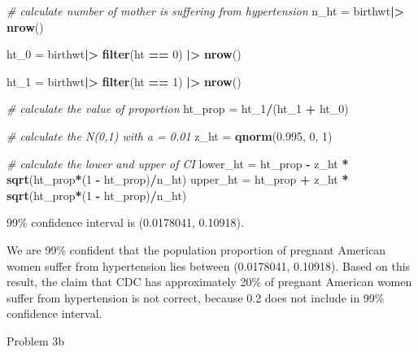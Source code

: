 \documentclass[
]{article}
\newenvironment{Shaded}{\begin{snugshade}}{\end{snugshade}}
\newcommand{\CommentTok}[1]{\textcolor[rgb]{0.56,0.35,0.01}{\textit{#1}}}
\newcommand{\DecValTok}[1]{\textcolor[rgb]{0.00,0.00,0.81}{#1}}
\newcommand{\FloatTok}[1]{\textcolor[rgb]{0.00,0.00,0.81}{#1}}
\newcommand{\FunctionTok}[1]{\textcolor[rgb]{0.13,0.29,0.53}{\textbf{#1}}}
\newcommand{\NormalTok}[1]{#1}
\newcommand{\OtherTok}[1]{\textcolor[rgb]{0.56,0.35,0.01}{#1}}
\newcommand{\SpecialCharTok}[1]{\textcolor[rgb]{0.81,0.36,0.00}{\textbf{#1}}}
\begin{document}
\begin{Shaded}
\begin{Highlighting}[]
\CommentTok{\# calculate number of mother is suffering from hypertension}
\NormalTok{n\_ht }\OtherTok{=} 
\NormalTok{  birthwt}\SpecialCharTok{|\textgreater{}}
  \FunctionTok{nrow}\NormalTok{()}

\NormalTok{ht\_0 }\OtherTok{=} 
\NormalTok{  birthwt}\SpecialCharTok{|\textgreater{}}
  \FunctionTok{filter}\NormalTok{(ht }\SpecialCharTok{==} \DecValTok{0}\NormalTok{) }\SpecialCharTok{|\textgreater{}}
  \FunctionTok{nrow}\NormalTok{()}

\NormalTok{ht\_1 }\OtherTok{=}
\NormalTok{  birthwt}\SpecialCharTok{|\textgreater{}}
  \FunctionTok{filter}\NormalTok{(ht }\SpecialCharTok{==} \DecValTok{1}\NormalTok{) }\SpecialCharTok{|\textgreater{}}
  \FunctionTok{nrow}\NormalTok{()}

\CommentTok{\# calculate the value of proportion}
\NormalTok{ht\_prop }\OtherTok{=}\NormalTok{ ht\_1}\SpecialCharTok{/}\NormalTok{(ht\_1 }\SpecialCharTok{+}\NormalTok{ ht\_0)}

\CommentTok{\# calculate the N(0,1) with a = 0.01}
\NormalTok{z\_ht }\OtherTok{=} \FunctionTok{qnorm}\NormalTok{(}\FloatTok{0.995}\NormalTok{, }\DecValTok{0}\NormalTok{, }\DecValTok{1}\NormalTok{)}

\CommentTok{\# calculate the lower and upper of CI}
\NormalTok{lower\_ht }\OtherTok{=}\NormalTok{ ht\_prop }\SpecialCharTok{{-}}\NormalTok{ z\_ht }\SpecialCharTok{*} \FunctionTok{sqrt}\NormalTok{(ht\_prop}\SpecialCharTok{*}\NormalTok{(}\DecValTok{1} \SpecialCharTok{{-}}\NormalTok{ ht\_prop)}\SpecialCharTok{/}\NormalTok{n\_ht)}
\NormalTok{upper\_ht }\OtherTok{=}\NormalTok{ ht\_prop }\SpecialCharTok{+}\NormalTok{ z\_ht }\SpecialCharTok{*} \FunctionTok{sqrt}\NormalTok{(ht\_prop}\SpecialCharTok{*}\NormalTok{(}\DecValTok{1} \SpecialCharTok{{-}}\NormalTok{ ht\_prop)}\SpecialCharTok{/}\NormalTok{n\_ht)}
\end{Highlighting}
\end{Shaded}

99\% confidence interval is (0.0178041, 0.10918).

We are 99\% confident that the population proportion of pregnant
American women suffer from hypertension lies between (0.0178041,
0.10918). Based on this result, the claim that CDC has approximately
20\% of pregnant American women suffer from hypertension is not correct,
because 0.2 does not include in 99\% confidence interval.

Problem 3b
\end{document}
